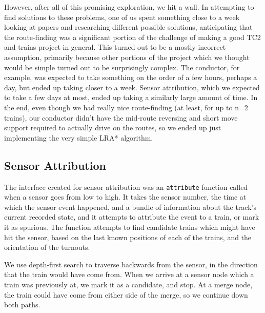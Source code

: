 \documentclass{article}
\begin{document}
However, after all of this promising exploration, we hit a wall. In attempting
to find solutions to these problems, one of us spent something
close to a week looking at papers and researching different possible solutions,
anticipating that the route-finding was a significant portion of the challenge
of making a good TC2 and trains project in general. This turned out to be a
mostly incorrect assumption, primarily because other portions of the project
which we thought would be simple turned out to be surprisingly complex. The
conductor, for example, was expected to take something on the order of a few
hours, perhaps a day, but ended up taking closer to a week. Sensor attribution,
which we expected to take a few days at most, ended up taking a similarly
large amount of time. In the end, even though we had really nice route-finding
(at least, for up to n=2 trains), our conductor didn't have the mid-route
reversing and short move support required to actually drive on the routes, so
we ended up just implementing the very simple LRA* algorithm.

\subsection{Sensor Attribution}
The interface created for sensor attribution was an \texttt{attribute} function called when a sensor goes from low to high.
It takes the sensor number, the time at which the sensor event happened, and a bundle of information about the track's current
recorded state, and it attempts to attribute the event to a train, or mark it as spurious.
The function attempts to find candidate trains which might have hit the sensor, based on the last
known positions of each of the trains, and the orientation of the turnouts.

We use depth-first search to traverse backwards from the sensor, in the direction that the train would have come from.
When we arrive at a sensor node which a train was previously at, we mark it as a candidate, and stop.
At a merge node, the train could have come from either side of the merge, so we continue down both
paths.
\end{document}

